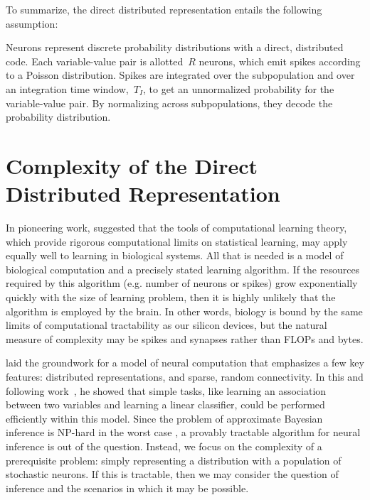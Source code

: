 To summarize, the direct distributed representation entails the following
assumption:

\begin{assumption}
  Neurons represent discrete probability distributions with a direct,
  distributed code. Each variable-value pair is allotted~$R$ neurons,
  which emit spikes according to a Poisson distribution.
  Spikes are integrated over the subpopulation and over an integration
  time window,~$T_I$, to get an unnormalized probability for the
  variable-value pair. By normalizing across subpopulations, they decode
  the probability distribution. 
\end{assumption}

\section{Complexity of the Direct Distributed Representation}
\label{sec:complexity}

In pioneering work, \citet{valiant1994circuits} suggested that
the tools of computational learning theory, which provide
rigorous computational limits on statistical learning, may
apply equally well to learning in biological systems. All
that is needed is a model of biological computation and a
precisely stated learning algorithm. If the resources
required by this algorithm (e.g. number of neurons or spikes)
grow exponentially quickly with the size of learning problem,
then it is highly unlikely that the algorithm is employed
by the brain. In other words, biology is bound by the same
limits of computational tractability as our silicon devices,
but the natural measure of complexity may be spikes and
synapses rather than FLOPs and bytes.

\citet{valiant1994circuits} laid the groundwork for a model of neural
computation that emphasizes a few key features: distributed
representations, and sparse, random connectivity. In this and
following work~\citep{valiant2005memorization,
  valiant2006quantitative}, he showed that simple tasks, like learning
an association between two variables and learning a linear classifier,
could be performed efficiently within this model. Since the problem of
approximate Bayesian inference is NP-hard in the worst case
\citep{dagum1993approximating, roth1996hardness}, a provably tractable
algorithm for neural inference is out of the question. Instead, we
focus on the complexity of a prerequisite problem: simply representing
a distribution with a population of stochastic neurons. If this is
tractable, then we may consider the question of inference and the
scenarios in which it may be possible.

